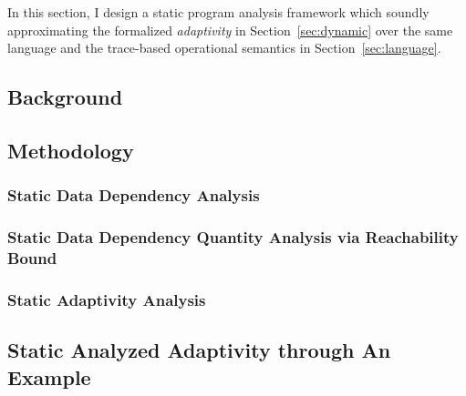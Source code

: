 In this section, I design a static program analysis framework which soundly approximating the formalized 
\emph{adaptivity} in Section~\ref{sec:dynamic} 
over the same language and the trace-based operational semantics in Section~\ref{sec:language}.
\subsection{Background}
\label{subsec:static-intro}


\subsection{Methodology}
\label{subsec:static-methodology}



\subsubsection{Static Data Dependency Analysis}
\label{subsubsec:static-datadep}


\subsubsection{Static Data Dependency Quantity Analysis via Reachability Bound}
\label{subsubsec:static-reachability}


\subsubsection{Static Adaptivity Analysis}
\label{subsubsec:static-adapt}


\subsection{Static Analyzed Adaptivity through An Example}
\label{subsec:static-examples}
% 

%
